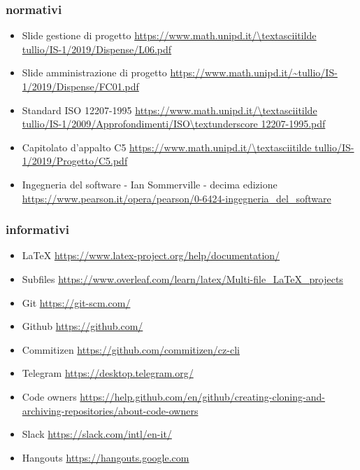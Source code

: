 \documentclass[../norme-di-progetto.tex]{subfiles}
\begin{document}
\subsubsection{normativi}
\label{subs:normativi}
\begin{itemize}
	\item Slide gestione di progetto 
	\newline \url{https://www.math.unipd.it/\textasciitilde tullio/IS-1/2019/Dispense/L06.pdf}
	\item Slide amministrazione di progetto
	\newline \url{https://www.math.unipd.it/~tullio/IS-1/2019/Dispense/FC01.pdf}
	\item Standard ISO 12207-1995 
	\newline \url{https://www.math.unipd.it/\textasciitilde tullio/IS-1/2009/Approfondimenti/ISO\textunderscore 12207-1995.pdf}
	\item Capitolato d'appalto C5 
	\newline \url{https://www.math.unipd.it/\textasciitilde tullio/IS-1/2019/Progetto/C5.pdf}
	\item Ingegneria del software - Ian Sommerville - decima edizione
	\newline \url{https://www.pearson.it/opera/pearson/0-6424-ingegneria_del_software}
\end{itemize}
\subsubsection{informativi}
\label{subs:riferimenti informativi}
\begin{itemize}
	\item LaTeX
	\newline \url{https://www.latex-project.org/help/documentation/}
	\item Subfiles
	\newline \url{https://www.overleaf.com/learn/latex/Multi-file_LaTeX_projects}
	\item Git
	\newline \url{https://git-scm.com/}
	\item Github
	\newline \url{https://github.com/}
	\item Commitizen
	\newline \url{https://github.com/commitizen/cz-cli}
	\item Telegram
	\newline \url{https://desktop.telegram.org/}
	\item Code owners
	\newline \url{https://help.github.com/en/github/creating-cloning-and-archiving-repositories/about-code-owners}
	\item Slack
	\newline \url{https://slack.com/intl/en-it/}
	\item Hangouts
    \newline \url{https://hangouts.google.com}
\end{itemize}
\end{document}

